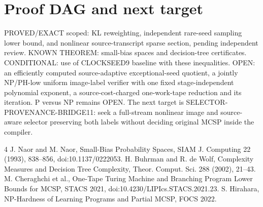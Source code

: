 \documentclass[11pt]{article}
\begin{document}
\section*{Proof DAG and next target}
PROVED/EXACT scoped: KL reweighting, independent rare-seed sampling lower bound, and nonlinear source-transcript sparse section, pending independent review. KNOWN THEOREM: small-bias spaces and decision-tree certificates. CONDITIONAL: use of CLOCKSEED9 baseline with these inequalities. OPEN: an efficiently computed source-adaptive exceptional-seed quotient, a jointly NP/PH-low uniform image-label verifier with one fixed stage-independent polynomial exponent, a source-cost-charged one-work-tape reduction and its iteration. P versus NP remains OPEN. The next target is SELECTOR-PROVENANCE-BRIDGE11: seek a full-stream nonlinear image and source-aware selector preserving both labels without deciding original MCSP inside the compiler.

\begin{thebibliography}{4}
 J. Naor and M. Naor, Small-Bias Probability Spaces, SIAM J. Computing 22 (1993), 838--856, doi:10.1137/0222053.
 H. Buhrman and R. de Wolf, Complexity Measures and Decision Tree Complexity, Theor. Comput. Sci. 288 (2002), 21--43.
 M. Cheraghchi et al., One-Tape Turing Machine and Branching Program Lower Bounds for MCSP, STACS 2021, doi:10.4230/LIPIcs.STACS.2021.23.
 S. Hirahara, NP-Hardness of Learning Programs and Partial MCSP, FOCS 2022.
\end{thebibliography}
\end{document}

